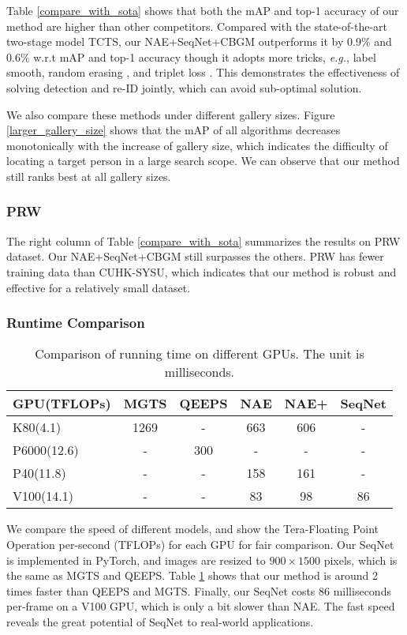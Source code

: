 \documentclass[letterpaper]{article} \usepackage{aaai21}  \usepackage{times}  \usepackage{helvet} \usepackage{courier}  \usepackage[hyphens]{url}  \usepackage{graphicx} \urlstyle{rm} \def\UrlFont{\rm}  \usepackage{natbib}  \usepackage{caption} \usepackage{multirow}
\begin{document}
Table \ref{compare_with_sota} shows that both the mAP and top-1 accuracy of our method are higher than other competitors. Compared with the state-of-the-art two-stage model TCTS, our NAE+SeqNet+CBGM outperforms it by 0.9\% and 0.6\% w.r.t mAP and top-1 accuracy though it adopts more tricks, \textit{e.g.}, label smooth, random erasing \cite{random-erasing}, and triplet loss \cite{triplet-loss}.
This demonstrates the effectiveness of solving detection and re-ID jointly, which can avoid sub-optimal solution.

We also compare these methods under different gallery sizes. Figure \ref{larger_gallery_size} shows that the mAP of all algorithms decreases monotonically with the increase of gallery size, which indicates the difficulty of locating a target person in a large search scope. We can observe that our method still ranks best at all gallery sizes.

\subsubsection{PRW}
The right column of Table \ref{compare_with_sota} summarizes the results on PRW dataset. Our NAE+SeqNet+CBGM still surpasses the others. PRW has fewer training data than CUHK-SYSU, which indicates that our method is robust and effective for a relatively small dataset.

\subsubsection{Runtime Comparison}
\begin{table}[t]
    \centering
\resizebox{0.9\columnwidth}{!}
    {
        \begin{tabular}{|l|ccccc|}
            \hline
            GPU(TFLOPs) & MGTS & QEEPS & NAE & NAE+ & SeqNet \\ \hline \hline
            K80(4.1)    & 1269 & -     & 663 & 606  & -      \\
            P6000(12.6) & -    & 300   & -   & -    & -      \\
            P40(11.8)   & -    & -     & 158 & 161  & -      \\
            V100(14.1)  & -    & -     & 83  & 98   & 86     \\ \hline
        \end{tabular}
    }
    \caption{Comparison of running time on different GPUs. The unit is milliseconds.}
    \label{time_comparison}
\end{table}
We compare the speed of different models, and show the Tera-Floating Point Operation per-second (TFLOPs) for each GPU for fair comparison. Our SeqNet is implemented in PyTorch, and images are resized to $900\times1500$ pixels, which is the same as MGTS and QEEPS. Table \ref{time_comparison} shows that our method is around 2 times faster than QEEPS and MGTS. Finally, our SeqNet costs 86 milliseconds per-frame on a V100 GPU, which is only a bit slower than NAE. The fast speed reveals the great potential of SeqNet to real-world applications.
\end{document}
